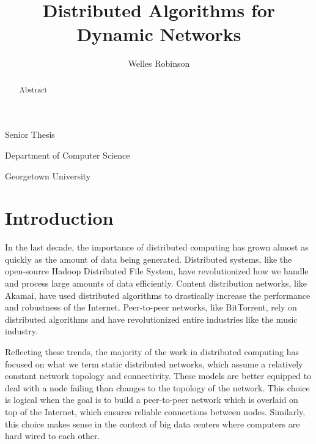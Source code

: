 \documentclass[english]{article}
\begin{document}
\title{Distributed Algorithms for Dynamic Networks}

\maketitle
\begin{center}\author{Welles Robinson}\end{center}
\noindent \begin{center}Senior Thesis\par\end{center}
\noindent \begin{center}Department of Computer
Science\par\end{center}
\noindent \begin{center}Georgetown University\par\end{center}

\newtheorem{definition} {Definition}
\newcommand{\mydef}[1]{\begin{definition}#1\end{definition}}

\begin{abstract}
Abstract
\end{abstract}


\section{Introduction}

In the last decade, the importance of distributed computing has grown almost as quickly as the amount of data being generated. Distributed systems, like the open-source Hadoop Distributed File System, have revolutionized how we handle and process large amounts of data efficiently. Content distribution networks, like Akamai, have used distributed algorithms to drastically increase the performance and robustness of the Internet. Peer-to-peer networks, like BitTorrent, rely on distributed algorithms and have revolutionized entire industries like the music industry.

Reflecting these trends, the majority of the work in distributed computing has focused on what we term static distributed networks, which assume a relatively constant network topology and connectivity. These models are better equipped to deal with a node failing than changes to the topology of the network. This choice is logical when the goal is to build a peer-to-peer network which is overlaid on top of the Internet, which ensures reliable connections between nodes. Similarly, this choice makes sense in the context of big data centers where computers are hard wired to each other. 
\end{document}
